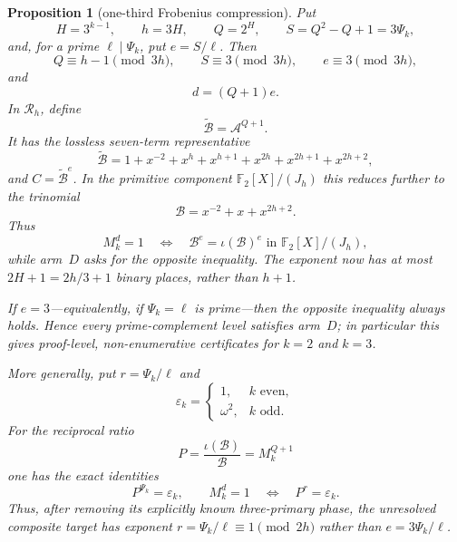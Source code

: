\documentclass[11pt]{article}
\newtheorem{proposition}[theorem]{Proposition}
\theoremstyle{definition}
\theoremstyle{remark}
\begin{document}
\begin{proposition}[one-third Frobenius compression]
\label{prop:d-one-third}
Put
\[
 H=3^{k-1},\qquad h=3H,\qquad Q=2^H,
 \qquad S=Q^2-Q+1=3\Psi_k,
\]
and, for a prime $\ell\mid\Psi_k$, put $e=S/\ell$.  Then
\[
 Q\equiv h-1\pmod {3h},\qquad
 S\equiv3\pmod {3h},\qquad
 e\equiv3\pmod {3h},
\]
and
\[
 d=(Q+1)e.
\]
In $\mathcal R_h$, define
\[
 \widetilde{\mathcal B}=\mathcal A^{Q+1}.
\]
It has the lossless seven-term representative
\[
 \widetilde{\mathcal B}
 =1+x^{-2}+x^h+x^{h+1}+x^{2h}+x^{2h+1}+x^{2h+2},
\]
and $C=\widetilde{\mathcal B}^{e}$.  In the primitive component
$\mathbb F_2[X]/(J_h)$ this reduces further to the trinomial
\[
 \mathcal B=x^{-2}+x+x^{2h+2}.
\]
Thus
\[
 M_k^d=1
 \quad\Longleftrightarrow\quad
 \mathcal B^e=\iota(\mathcal B)^e
       \text{ in }\mathbb F_2[X]/(J_h),
\]
while arm~$D$ asks for the opposite inequality.  The exponent now has at
most $2H+1=2h/3+1$ binary places, rather than $h+1$.

If $e=3$---equivalently, if $\Psi_k=\ell$ is prime---then the opposite
inequality always holds.  Hence every prime-complement level satisfies
arm~$D$; in particular this gives proof-level, non-enumerative certificates
for $k=2$ and $k=3$.

More generally, put $r=\Psi_k/\ell$ and
\[
 \varepsilon_k=
 \begin{cases}
  1,&k\text{ even},\\
  \omega^2,&k\text{ odd}.
 \end{cases}
\]
For the reciprocal ratio
\[
 P=\frac{\iota(\mathcal B)}{\mathcal B}
   =M_k^{Q+1}
\]
one has the exact identities
\[
 P^{\Psi_k}=\varepsilon_k,
 \qquad
 M_k^d=1\quad\Longleftrightarrow\quad P^r=\varepsilon_k.
\]
Thus, after removing its explicitly known three-primary phase, the unresolved
composite target has exponent $r=\Psi_k/\ell\equiv1\pmod {2h}$ rather than
$e=3\Psi_k/\ell$.
\end{proposition}
\end{document}
